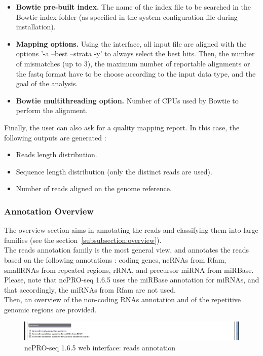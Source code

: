 \documentclass[12pt]{article}
\def \ncpip{ncPRO-seq 1.6.5}
\begin{document}
\begin{itemize}
\item \textbf{Bowtie pre-built index.} The name of the index file to be searched in the Bowtie index folder (as specified in the system configuration file during installation). 
\item \textbf{Mapping options.} Using the interface, all input file are aligned with the options '-a --best --strata -y' to always select the best hits. Then, the number of mismatches (up to 3), the maximum number of reportable alignments or the fastq format have to be choose according to the input data type, and the goal of the analysis. 
\item \textbf{Bowtie multithreading option.} Number of CPUs used by Bowtie to perform the alignment.
\end{itemize}
Finally, the user can also ask for a quality mapping report. In this case, the following outputs are generated :
\begin{itemize}
\item Reads length distribution.
\item Sequence length distribution (only the distinct reads are used).
\item Number of reads aligned on the genome reference.
\end{itemize}

\subsubsection{Annotation Overview}
The overview section aims in annotating the reads and classifying them into large families (see the section~\ref{subsubsection:overview}).\\
The reads annotation family is the most general view, and annotates the reads based on the following annotations : coding genes, ncRNAs from Rfam, smallRNAs from repeated regions, rRNA, and precursor miRNA from miRBase. Please, note that \ncpip{} uses the miRBase annotation for miRNAs, and that accordingly, the miRNAs from Rfam are not used.\\
Then, an overview of the non-coding RNAs annotation and of the repetitive genomic regions are provided.
\begin{figure}[!h]
\includegraphics[width=\textwidth]{web_3.png}
\caption{\ncpip{} web interface: reads annotation}
\label{fig:web3}
\end{figure} 
\end{document}
